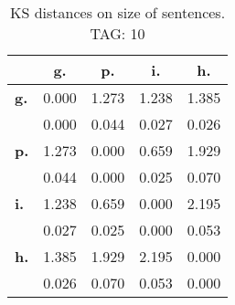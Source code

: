 \begin{table}[h!]
\begin{center}
\begin{tabular}{| l || c | c | c | c |}\hline
 & {\bf g.} & {\bf p.} & {\bf i.} & {\bf h.} \\\hline\hline
{\bf g.} & 0.000 & 1.273 & 1.238 & 1.385 \\
{\bf } & 0.000 & 0.044 & 0.027 & 0.026 \\\hline
{\bf p.} & 1.273 & 0.000 & 0.659 & 1.929 \\
{\bf } & 0.044 & 0.000 & 0.025 & 0.070 \\\hline
{\bf i.} & 1.238 & 0.659 & 0.000 & 2.195 \\
{\bf } & 0.027 & 0.025 & 0.000 & 0.053 \\\hline
{\bf h.} & 1.385 & 1.929 & 2.195 & 0.000 \\
{\bf } & 0.026 & 0.070 & 0.053 & 0.000 \\\hline
\end{tabular}
\caption{KS distances on size of sentences. TAG: 10}
\end{center}
\end{table}